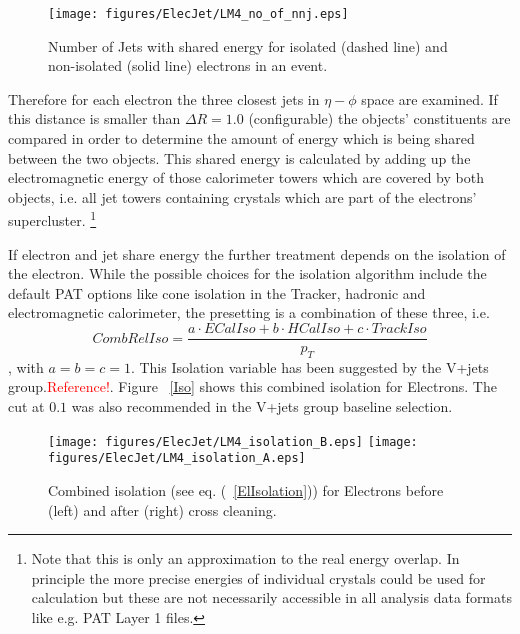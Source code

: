 \documentclass{cmspaper}
\begin{document}
\begin{figure}[hbtp]
  \begin{center}
    \texttt{[image: figures/ElecJet/LM4\_no\_of\_nnj.eps]}
    \caption{Number of Jets with shared energy for isolated (dashed line) and non-isolated (solid line) electrons in an event.}
    \label{fig:NbJets}
  \end{center}
\end{figure}

Therefore for each electron the three closest jets in \( \eta-\phi\) space are
examined. If this distance is smaller than $\Delta R=1.0$ (configurable) the
objects' constituents are compared in order to determine the amount of energy
which is being shared between the two objects.
This shared energy is calculated by adding up the electromagnetic energy of
those calorimeter towers which are covered by both objects, i.e. all jet towers
containing crystals which are part of the electrons' supercluster.
\footnote{Note that this is only an approximation to the real energy overlap. In
principle the more precise energies of individual crystals could be used for
calculation but these are not necessarily accessible in all analysis data
formats like e.g. PAT Layer 1 files.}

If electron and jet share energy the further treatment depends on the isolation
of the electron. While the possible choices for the isolation algorithm include
the default PAT options like cone isolation in the Tracker, hadronic and
electromagnetic calorimeter, the presetting is a combination of these three, i.e. 
\begin{equation}
    CombRelIso=\frac{a\cdot ECalIso+b\cdot HCalIso+c\cdot TrackIso}{p_T}
    \label{ElIsolation}
\end{equation}
, with \(a=b=c=1\). This Isolation variable has been suggested by the V+jets
group.\textcolor{red}{Reference!}. Figure ~\ref{Iso} shows this combined
isolation for Electrons. The cut at \(0.1\) was also recommended in the V+jets
group baseline selection.

\begin{figure}[hbtp]
  \begin{center}
    \texttt{[image: figures/ElecJet/LM4\_isolation\_B.eps]}
    \texttt{[image: figures/ElecJet/LM4\_isolation\_A.eps]}
    \caption{Combined isolation (see eq. (~\ref{ElIsolation})) for Electrons before (left) and after (right) cross cleaning.}
    \label{fig:ElectronIsolation}
  \end{center}
\end{figure}
\end{document}

